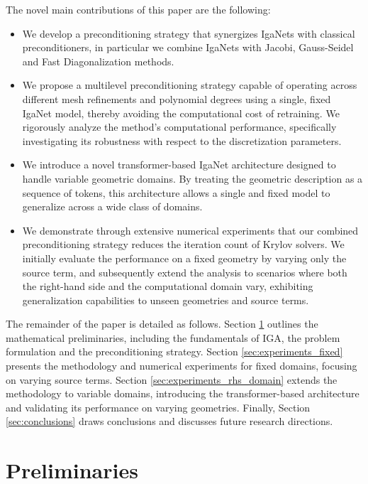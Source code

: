 \documentclass{article}
\theoremstyle{plain}
\numberwithin{equation}{section}
\begin{document}
The novel main contributions of this paper are the following:
\begin{itemize}
    \item We develop a preconditioning strategy that synergizes IgaNets with classical preconditioners, in particular we combine IgaNets with Jacobi, Gauss-Seidel and Fast Diagonalization \cite{Lynch1964} methods.
    \item We propose a multilevel preconditioning strategy capable of operating across different mesh refinements and polynomial degrees using a single, fixed IgaNet model, thereby avoiding the computational cost of retraining. We rigorously analyze the method's computational performance, specifically investigating its robustness with respect to the discretization parameters.
    \item We introduce a novel transformer-based IgaNet architecture designed to handle variable geometric domains. By treating the geometric description as a sequence of tokens, this architecture allows a single and fixed model to generalize across a wide class of domains.
    \item We demonstrate through extensive numerical experiments that our combined preconditioning strategy reduces the iteration count of Krylov solvers. We initially evaluate the performance on a fixed geometry by varying only the source term, and subsequently extend the analysis to scenarios where both the right-hand side and the computational domain vary, exhibiting generalization capabilities to unseen geometries and source terms.
\end{itemize}

The remainder of the paper is detailed as follows. Section \ref{sec:preliminaries} outlines the mathematical preliminaries, including the fundamentals of IGA, the problem formulation and the preconditioning strategy. Section \ref{sec:experiments_fixed} presents the methodology and numerical experiments for fixed domains, focusing on varying source terms. Section \ref{sec:experiments_rhs_domain} extends the methodology to variable domains, introducing the transformer-based architecture and validating its performance on varying geometries. Finally, Section \ref{sec:conclusions} draws conclusions and discusses future research directions.

\section{Preliminaries} \label{sec:preliminaries}
\end{document}
